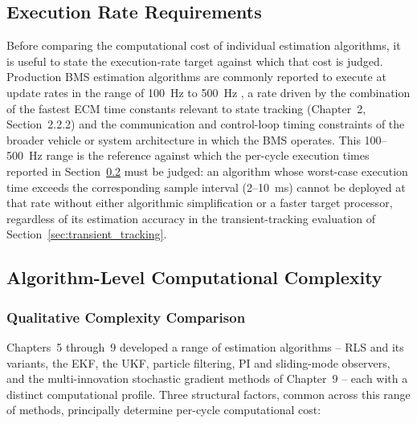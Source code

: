\subsection{Execution Rate Requirements}
\label{ssec:realtime_requirements}

Before comparing the computational cost of individual estimation algorithms, it is useful to state the execution-rate target against which that cost is judged. Production BMS estimation algorithms are commonly reported to execute at update rates in the range of 100~Hz to 500~Hz \cite{mathworks_hil_bms_video}, a rate driven by the combination of the fastest ECM time constants relevant to state tracking (Chapter~2, Section~2.2.2) and the communication and control-loop timing constraints of the broader vehicle or system architecture in which the BMS operates. This 100--500~Hz range is the reference against which the per-cycle execution times reported in Section~\ref{ssec:algorithm_complexity} must be judged: an algorithm whose worst-case execution time exceeds the corresponding sample interval (2--10~ms) cannot be deployed at that rate without either algorithmic simplification or a faster target processor, regardless of its estimation accuracy in the transient-tracking evaluation of Section~\ref{sec:transient_tracking}.

\subsection{Algorithm-Level Computational Complexity}
\label{ssec:algorithm_complexity}

\subsubsection{Qualitative Complexity Comparison}

Chapters~5 through~9 developed a range of estimation algorithms -- RLS and its variants, the EKF, the UKF, particle filtering, PI and sliding-mode observers, and the multi-innovation stochastic gradient methods of Chapter~9 -- each with a distinct computational profile. Three structural factors, common across this range of methods, principally determine per-cycle computational cost:

